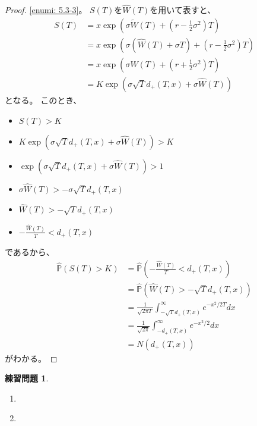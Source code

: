 \documentclass[uplatex]{jsarticle}
\theoremstyle{definition}
\newtheorem{prob}[prob]{練習問題}
\def\P{\mathbb{P}}
\begin{document}
\begin{proof}
  \ref{enumi: 5.3-3}。
  \(S(T)\)を\(\hat{W}(T)\)を用いて表すと、
  \begin{align*}
    S(T) &= x\exp \left( \sigma\tilde{W}(T)
    + \left( r - \frac{1}{2}\sigma^2\right)T \right) \\
    &= x\exp \left( \sigma\left( \hat{W}(T) + \sigma T\right)
    + \left( r - \frac{1}{2}\sigma^2\right)T \right) \\
    &= x\exp \left( \sigma \hat{W}(T)
    + \left( r + \frac{1}{2}\sigma^2\right)T \right) \\
    &= K\exp \left(\sigma \sqrt{T} d_+(T,x) + \sigma \hat{W}(T)\right)
  \end{align*}
  となる。
  このとき、
  \begin{itemize}
    \item[ \ ]
    \(S(T) > K\)
    \item[\(\iff\)]
    \(K\exp \left(\sigma \sqrt{T} d_+(T,x)
    + \sigma \hat{W}(T)\right) > K \)
    \item[\(\iff\)]
    \(\exp \left(\sigma \sqrt{T} d_+(T,x) + \sigma \hat{W}(T)\right) > 1 \)
    \item[\(\iff\)]
    \(\sigma \hat{W}(T) > - \sigma \sqrt{T} d_+(T,x)\)
    \item[\(\iff\)]
    \(\hat{W}(T) > - \sqrt{T} d_+(T,x)\)
    \item[\(\iff\)]
    \(-\frac{\hat{W}(T)}{T} < d_+(T,x)\)
  \end{itemize}
  であるから、
  \begin{align*}
    \hat{\P}(S(T) > K)
    &= \hat{\P}\left(-\frac{\hat{W}(T)}{T} < d_+(T,x)\right) \\
    &= \hat{\P}\left( \hat{W}(T) > - \sqrt{T} d_+(T,x)\right) \\
    &= \frac{1}{\sqrt{2\pi T}}\int_{- \sqrt{T} d_+(T,x)}^\infty
    e^{-x^2/2T} dx \\
    &= \frac{1}{\sqrt{2\pi }}\int_{-d_+(T,x)}^\infty e^{-x^2/2} dx \\
    &= N(d_+(T,x))
  \end{align*}
  がわかる。
\end{proof}











\begin{prob}\label{prob: 5.4}
  \begin{enumerate}
    \item \label{enumi: 5.4-1}
    \item \label{enumi: 5.4-2}
  \end{enumerate}
\end{prob}
\end{document}
